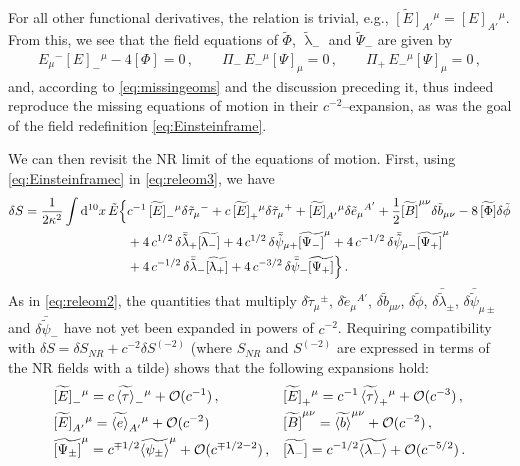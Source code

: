 \documentclass[a4paper,10pt,openany]{article}
\def\rmd{\mathrm{d}}
\begin{document}
	For all other functional derivatives, the relation is trivial, e.g., $\widetilde{[E]}_{A'}{}^\mu = [E]_{A'}{}^\mu$. From this, we see that the field equations of $\tilde{\Phi}$, $\tilde{\uplambda}_-$ and $\tilde{\Psi}_{-}$ are given by
	\begin{align}
		E_\mu{}^- [E]_-{}^\mu - 4 [\Phi] = 0 \,, \qquad \Pi_-\,E_-{}^\mu [\Psi]_\mu = 0\,, \qquad\Pi_+\,E_-{}^\mu [\Psi]_\mu = 0\,,
	\end{align}
	and, according to \eqref{eq:missingeoms} and the discussion preceding it, thus indeed reproduce the missing equations of motion in their $c^{-2}$--expansion, as was the goal of the field redefinition \eqref{eq:Einsteinframe}.
	
	We can then revisit the NR limit of the equations of motion. First, using \eqref{eq:Einsteinframec} in \eqref{eq:releom3}, we have
	\begin{align} \label{eq:releom4}
		\delta S = \frac{1}{2\kappa^2}\int \rmd^{10}x\,\tilde E\Big\{ & c^{-1} \, \widetilde{[E]}_-{}^\mu\delta\tilde\tau_\mu{}^- + c\, \widetilde{[E]}_+{}^\mu\delta\tilde\tau_\mu{}^+ + \widetilde{[E]}_{A'}{}^\mu\delta\tilde e_\mu{}^{A'} + \frac12 \widetilde{[B]}^{\mu\nu} \delta \tilde{b}_{\mu\nu} -8\,\widetilde{[\Phi]}\delta\tilde\phi \notag\\
		&+ 4\, c^{1/2}\, \delta\bar{\tilde \lambda}_+\widetilde{[\uplambda_-]}  + 4\, c^{1/2}\, \delta\bar{\tilde\psi}_{\mu+}\widetilde{[\Psi_-]}^\mu + 4\,c^{-1/2} \, \delta\bar{\tilde\psi}_{\mu-}\widetilde{[\Psi_+]}^\mu\notag\\
		&+ 4\, c^{-1/2} \, \delta\bar{\tilde \lambda}_-\widetilde{[\uplambda_+]} + 4\, c^{-3/2} \, \delta\bar{\tilde \psi}_{-}\widetilde{[\Psi_{+}]}\Big\}\,.
	\end{align}
	As in \eqref{eq:releom2}, the quantities that multiply $\delta \tilde\tau_\mu{}^\pm$, $\delta \tilde e_\mu{}^{A'}$, $\delta \tilde b_{\mu\nu}$, $\delta \tilde \phi$, $\delta \bar{\tilde\lambda}_\pm$, $\delta \bar{\tilde\psi}_{\mu \pm}$ and $\delta \bar{\tilde{\psi}}_-$ have not yet been expanded in powers of $c^{-2}$. Requiring compatibility with $\delta S = \delta S_{NR} + c^{-2} \delta S^{(-2)}$ (where $S_{NR}$ and $S^{(-2)}$ are expressed in terms of the NR fields with a tilde) shows that the following expansions hold:
	\begin{align}\label{eq:bulkeom}
		&\widetilde{[E]}_-{}^\mu = c\,\widetilde{\langle \tau\rangle}_-{}^\mu + \mathcal O(c^{-1})\,, &&\widetilde{[E]}_+{}^\mu = c^{-1}\,\widetilde{\langle \tau\rangle}_+{}^\mu + \mathcal O (c^{-3})\,,\notag\\
		&\widetilde{[E]}_{A'}{}^\mu = \widetilde{\langle e\rangle}_{A'}{}^\mu + \mathcal O(c^{-2}) && \widetilde{[B]}^{\mu\nu} = \widetilde{\langle b\rangle}^{\mu\nu} + \mathcal O(c^{-2})\,,\notag\\
		&\widetilde{[\Psi_\pm]}^\mu = c^{\mp 1/2}\widetilde{\langle\psi_\pm\rangle}^\mu + \mathcal O(c^{\mp 1/2-2})\,, &&\widetilde{[\uplambda_-]} = c^{-1/2}\widetilde{\langle\lambda_-\rangle} + \mathcal{O}(c^{-5/2})\,.
	\end{align}
\end{document}
